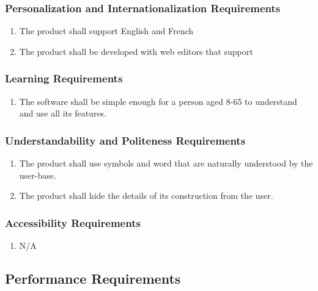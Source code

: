 \documentclass[]{article}
\begin{document}
\subsubsection{Personalization and Internationalization Requirements}
\label{ssub:personalization_and_internationalization_requirements}
\begin{enumerate}[{UH}1. ]
	\item The product shall support English and French
	\item The product shall be developed with web editors that support
\end{enumerate}

\subsubsection{Learning Requirements}
\label{ssub:learning_requirements}
\begin{enumerate}[{UH}1. ]
	\item The software shall be simple enough for a person aged 8-65 to understand and use all its features.
\end{enumerate}

\subsubsection{Understandability and Politeness Requirements}
\label{ssub:understandability_and_politeness_requirements}
\begin{enumerate}[{UH}1. ]
	\item  The product shall use symbols and word that are naturally understood by the user-base.
	\item  The product shall hide the details of its construction from the user.
\end{enumerate}

\subsubsection{Accessibility Requirements}
\label{ssub:accessibility_requirements}
\begin{enumerate}[{UH}1. ]
	\item N/A
\end{enumerate}


\subsection{Performance Requirements}
\label{sub:performance_requirements}
\end{document}
